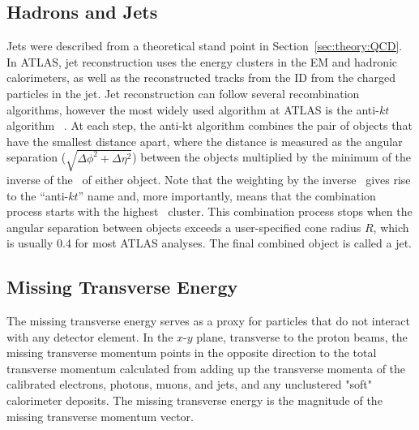 \subsection{Hadrons and Jets}
Jets were described from a theoretical stand point in Section~\ref{sec:theory:QCD}.
In ATLAS, jet reconstruction uses the energy clusters in the EM and hadronic calorimeters, as well as the reconstructed tracks from the ID from the charged particles in the jet.
Jet reconstruction can follow several recombination algorithms, however the most widely used algorithm at ATLAS is the anti-$kt$ algorithm ~\cite{Cacciari:2008gp, Cacciari:2011ma}.
At each step, the anti-kt algorithm combines the pair of objects that have the smallest distance apart, where the distance is measured as the angular separation ($\sqrt{\Delta \phi^2 + \Delta \eta^2}$) between the objects multiplied by the minimum of the inverse of the \et\ of either object.
Note that the weighting by the inverse \et\ gives rise to the ``anti-$kt$'' name and, more importantly,  means that the combination process starts with the highest \et\ cluster.
This combination process stops when the angular separation between objects exceeds a user-specified cone radius $R$, which is usually 0.4 for most ATLAS analyses.
The final combined object is called a jet. 

\subsection{Missing Transverse Energy}
The missing transverse energy serves as a proxy for particles that do not interact with any detector element.
In the $x$-$y$ plane, transverse to the proton beams, the missing transverse momentum points in the opposite direction to the total transverse momentum calculated from adding up the transverse momenta of the calibrated electrons, photons, muons, and jets, and any unclustered "soft" calorimeter deposits.
The missing transverse energy is the magnitude of the missing transverse momentum vector.